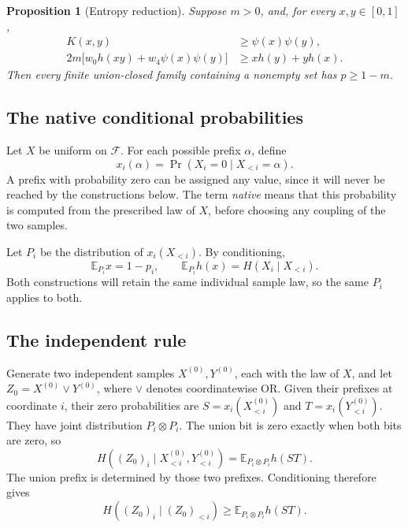 \documentclass[11pt]{article}
\newtheorem{proposition}[theorem]{Proposition}
\theoremstyle{remark}
\newcommand{\F}{\mathcal F}
\newcommand{\E}{\mathbb E}
\begin{document}
\begin{proposition}[Entropy reduction]\label{prop:reduction}
Suppose \(m>0\), and, for every \(x,y\in[0,1]\),
\begin{align}
K(x,y)&\ge\psi(x)\psi(y),\tag{K}\label{eq:K}\\
2m\bigl[w_0h(xy)+w_4\psi(x)\psi(y)\bigr]
&\ge xh(y)+yh(x).\tag{M}\label{eq:M}
\end{align}
Then every finite union-closed family containing a nonempty set
has \(p\ge1-m\).
\end{proposition}

\subsection{The native conditional probabilities}
Let \(X\) be uniform on \(\F\).
For each possible prefix \(\alpha\), define
\[
x_i(\alpha)=\Pr(X_i=0\mid X_{<i}=\alpha).
\]
A prefix with probability zero can be assigned any value, since it
will never be reached by the constructions below. The term
\emph{native} means that this probability is computed from the prescribed law of
\(X\), before choosing any coupling of the two samples.

Let \(P_i\) be the distribution of \(x_i(X_{<i})\). By conditioning,
\begin{equation}\label{eq:Pi}
\E_{P_i}x=1-p_i,\qquad
\E_{P_i}h(x)=H(X_i\mid X_{<i}).
\end{equation}
Both constructions will retain the same individual sample law, so
the same \(P_i\) applies to both.

\subsection{The independent rule}
Generate two independent samples \(X^{(0)},Y^{(0)}\), each with the
law of \(X\), and let \(Z_0=X^{(0)}\lor Y^{(0)}\), where \(\lor\)
denotes coordinatewise OR.
Given their prefixes at coordinate \(i\), their zero probabilities
are \(S=x_i(X^{(0)}_{<i})\) and \(T=x_i(Y^{(0)}_{<i})\).
They have joint distribution \(P_i\otimes P_i\). The union bit is
zero exactly when both bits are zero, so
\[
H((Z_0)_i\mid X^{(0)}_{<i},Y^{(0)}_{<i})
=\E_{P_i\otimes P_i}h(ST).
\]
The union prefix is determined by those two prefixes. Conditioning
therefore gives
\begin{equation}\label{eq:ind-lower}
H((Z_0)_i\mid (Z_0)_{<i})
\ge\E_{P_i\otimes P_i}h(ST).
\end{equation}
\end{document}
